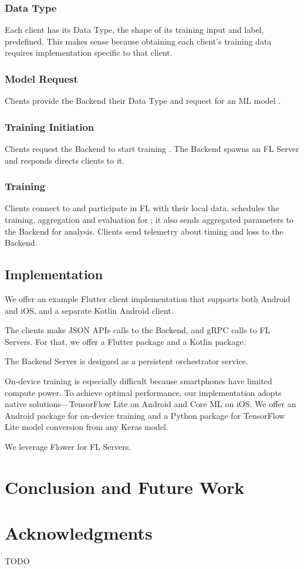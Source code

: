 \documentclass[letterpaper]{article} %
\begin{document}
\subsubsection{Data Type}
Each client has its Data Type, the shape of its training input and label,
predefined.
This makes sense because obtaining each client's training data requires
implementation specific to that client.

\subsubsection{Model Request}
Clients provide the Backend their Data Type and request for an ML model \model.

\subsubsection{Training Initiation}
Clients request the Backend to start training \model.
The Backend spawns an FL Server \fs{} and responds directs clients to it.

\subsubsection{Training}
Clients connect to \fs{} and participate in FL with their local data.
\fs{} schedules the training, aggregation and evaluation for \model;
it also sends aggregated parameters to the Backend for analysis.
Clients send telemetry about timing and loss to the Backend.

\subsection{Implementation}

We offer an example Flutter client implementation that supports both Android and
iOS, and a separate Kotlin Android client.

The clients make JSON APIs calls to the Backend,
and gRPC calls to FL Servers.
For that, we offer a Flutter package and a Kotlin package.

The Backend Server is designed as a persistent orchestrator service.

On-device training is especially difficult because smartphones have limited
compute power.
To achieve optimal performance, our implementation adopts native
solutions—TensorFlow Lite on Android and Core ML on iOS.
We offer an Android package for on-device training and a Python package for
TensorFlow Lite model conversion from any Keras model.

We leverage Flower \cite{beutel2020flower} for FL Servers.

\section{Conclusion and Future Work}

\appendix

\section*{Acknowledgments}
TODO

\bigskip


\end{document}

